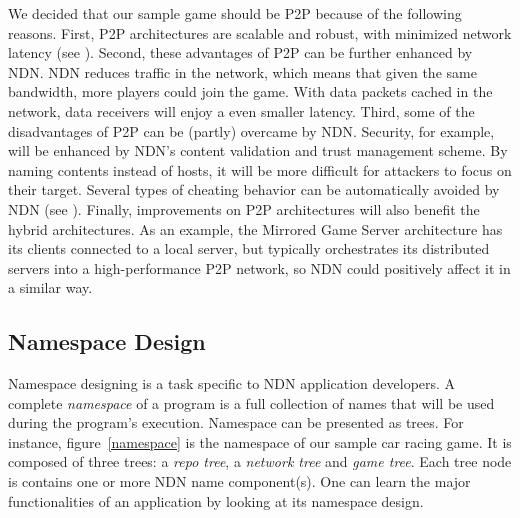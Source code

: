 \documentclass{sigchi}
\begin{document}
We decided that our sample game should be P2P because of the following reasons. First, P2P architectures are scalable and robust, with minimized network latency (see ). Second, these advantages of P2P can be further enhanced by NDN. NDN reduces traffic in the network, which means that given the same bandwidth, more players could join the game. With data packets cached in the network, data receivers will enjoy a even smaller latency. Third, some of the disadvantages of P2P can be (partly) overcame by NDN. Security, for example, will be enhanced by NDN's content validation and trust management scheme. By naming contents instead of hosts, it will be more difficult for attackers to focus on their target. Several types of cheating behavior can be automatically avoided by NDN (see ). Finally, improvements on P2P architectures will also benefit the hybrid architectures. As an example, the Mirrored Game Server architecture has its clients connected to a local server, but typically orchestrates its distributed servers into a high-performance P2P network, so NDN could positively affect it in a similar way.


\subsection{Namespace Design}

Namespace designing is a task specific to NDN application developers. A complete \emph{namespace} of a program is a full collection of names that will be used during the program's execution. Namespace can be presented as trees. For instance, figure~\ref{namespace} is the namespace of our sample car racing game. It is composed of three trees: a \emph{repo tree}, a \emph{network tree} and \emph{game tree}. Each tree node is contains one or more NDN name component(s). One can learn the major functionalities of an application by looking at its namespace design.
\end{document}
